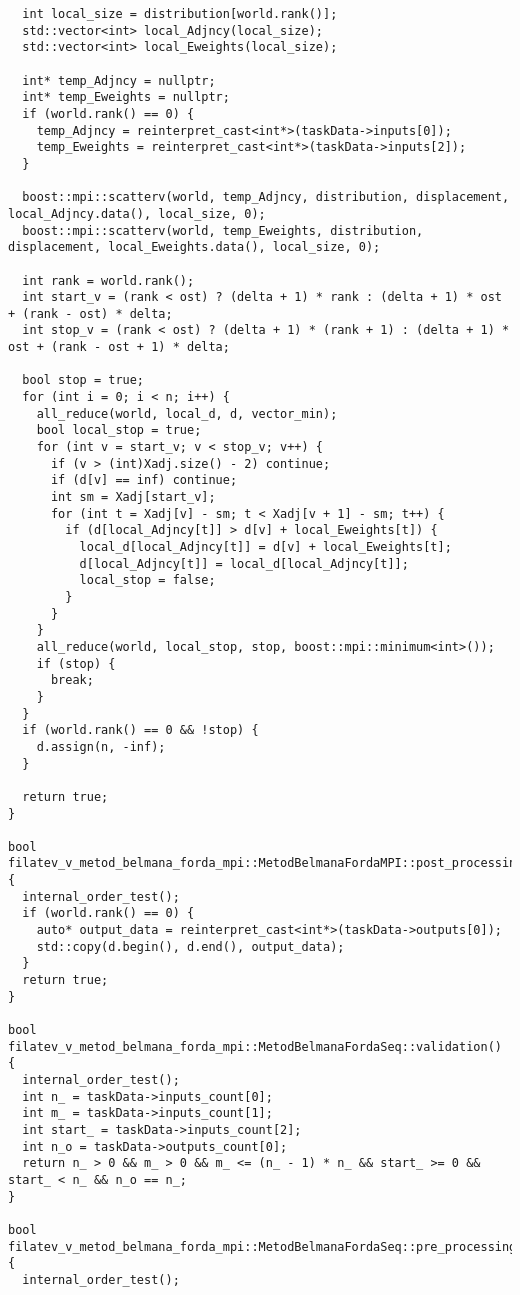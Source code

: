 \documentclass[a4paper, 14pt]{article}
\begin{document}
\begin{verbatim}
  int local_size = distribution[world.rank()];
  std::vector<int> local_Adjncy(local_size);
  std::vector<int> local_Eweights(local_size);

  int* temp_Adjncy = nullptr;
  int* temp_Eweights = nullptr;
  if (world.rank() == 0) {
    temp_Adjncy = reinterpret_cast<int*>(taskData->inputs[0]);
    temp_Eweights = reinterpret_cast<int*>(taskData->inputs[2]);
  }

  boost::mpi::scatterv(world, temp_Adjncy, distribution, displacement, local_Adjncy.data(), local_size, 0);
  boost::mpi::scatterv(world, temp_Eweights, distribution, displacement, local_Eweights.data(), local_size, 0);

  int rank = world.rank();
  int start_v = (rank < ost) ? (delta + 1) * rank : (delta + 1) * ost + (rank - ost) * delta;
  int stop_v = (rank < ost) ? (delta + 1) * (rank + 1) : (delta + 1) * ost + (rank - ost + 1) * delta;

  bool stop = true;
  for (int i = 0; i < n; i++) {
    all_reduce(world, local_d, d, vector_min);
    bool local_stop = true;
    for (int v = start_v; v < stop_v; v++) {
      if (v > (int)Xadj.size() - 2) continue;
      if (d[v] == inf) continue;
      int sm = Xadj[start_v];
      for (int t = Xadj[v] - sm; t < Xadj[v + 1] - sm; t++) {
        if (d[local_Adjncy[t]] > d[v] + local_Eweights[t]) {
          local_d[local_Adjncy[t]] = d[v] + local_Eweights[t];
          d[local_Adjncy[t]] = local_d[local_Adjncy[t]];
          local_stop = false;
        }
      }
    }
    all_reduce(world, local_stop, stop, boost::mpi::minimum<int>());
    if (stop) {
      break;
    }
  }
  if (world.rank() == 0 && !stop) {
    d.assign(n, -inf);
  }

  return true;
}

bool filatev_v_metod_belmana_forda_mpi::MetodBelmanaFordaMPI::post_processing() {
  internal_order_test();
  if (world.rank() == 0) {
    auto* output_data = reinterpret_cast<int*>(taskData->outputs[0]);
    std::copy(d.begin(), d.end(), output_data);
  }
  return true;
}

bool filatev_v_metod_belmana_forda_mpi::MetodBelmanaFordaSeq::validation() {
  internal_order_test();
  int n_ = taskData->inputs_count[0];
  int m_ = taskData->inputs_count[1];
  int start_ = taskData->inputs_count[2];
  int n_o = taskData->outputs_count[0];
  return n_ > 0 && m_ > 0 && m_ <= (n_ - 1) * n_ && start_ >= 0 && start_ < n_ && n_o == n_;
}

bool filatev_v_metod_belmana_forda_mpi::MetodBelmanaFordaSeq::pre_processing() {
  internal_order_test();


\end{verbatim}
\end{document}
